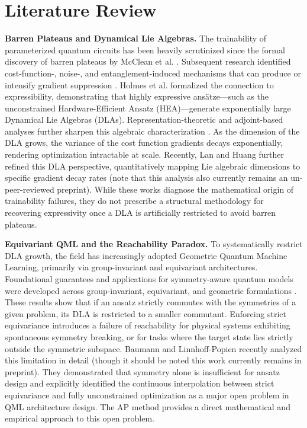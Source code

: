 \documentclass[pdflatex,sn-mathphys-num]{sn-jnl}
\theoremstyle{thmstyleone}
\theoremstyle{thmstyletwo}
\theoremstyle{thmstylethree}
\begin{document}
\section{Literature Review}

\textbf{Barren Plateaus and Dynamical Lie Algebras.} The trainability of parameterized quantum circuits has been heavily scrutinized since the formal discovery of barren plateaus by McClean et al. \cite{mcclean2018barren}. Subsequent research identified cost-function-, noise-, and entanglement-induced mechanisms that can produce or intensify gradient suppression \cite{cerezo2021cost,wang2021noise,ortiz2021entanglement}. Holmes et al. \cite{holmes2022connecting} formalized the connection to expressibility, demonstrating that highly expressive ans\"atze—such as the unconstrained Hardware-Efficient Ansatz (HEA)—generate exponentially large Dynamical Lie Algebras (DLAs). Representation-theoretic and adjoint-based analyses further sharpen this algebraic characterization \cite{fontana2023adjoint,ragone2023representation}. As the dimension of the DLA grows, the variance of the cost function gradients decays exponentially, rendering optimization intractable at scale. Recently, Lan and Huang \cite{lan2026dla} further refined this DLA perspective, quantitatively mapping Lie algebraic dimensions to specific gradient decay rates (note that this analysis also currently remains an un-peer-reviewed preprint). While these works diagnose the mathematical origin of trainability failures, they do not prescribe a structural methodology for recovering expressivity once a DLA is artificially restricted to avoid barren plateaus.

\textbf{Equivariant QML and the Reachability Paradox.} To systematically restrict DLA growth, the field has increasingly adopted Geometric Quantum Machine Learning, primarily via group-invariant and equivariant architectures. Foundational guarantees and applications for symmetry-aware quantum models were developed across group-invariant, equivariant, and geometric formulations \cite{larocca2022group,nguyen2024theory,meyer2023exploiting,skolik2023equivariant,schatzki2022theoretical}. These results show that if an ansatz strictly commutes with the symmetries of a given problem, its DLA is restricted to a smaller commutant. Enforcing strict equivariance introduces a failure of reachability for physical systems exhibiting spontaneous symmetry breaking, or for tasks where the target state lies strictly outside the symmetric subspace. Baumann and Linnhoff-Popien \cite{baumann2026exploiting} recently analyzed this limitation in detail (though it should be noted this work currently remains in preprint). They demonstrated that symmetry alone is insufficient for ansatz design and explicitly identified the continuous interpolation between strict equivariance and fully unconstrained optimization as a major open problem in QML architecture design. The AP method provides a direct mathematical and empirical approach to this open problem.
\end{document}
